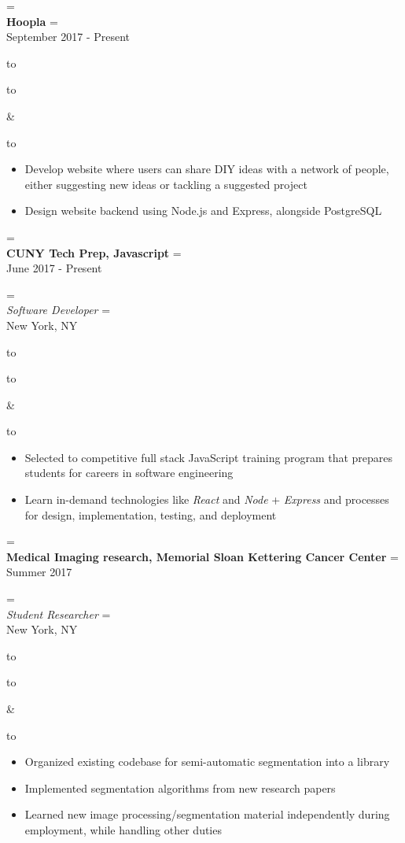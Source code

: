 \documentclass{article}
\newcommand{\appendtotoks}[2]{%
  #1=\expandafter{\the#1#2}%
}
\def\gobble#1{}
\def\gobblefirst#1{%
  #1\expandafter\expandafter\expandafter{\expandafter\gobble\the#1}}
\newcommand{\sectionTitle}[1]{{\Large #1} \vspace{4pt}}
\newenvironment{resumesection}[1]
  {\sectionTitle{#1}}
	{\vspace{10pt}}
\newcommand{\placeStyle}[1]{\textbf{#1}}
\newcommand{\positionStyle}[1]{\textit{#1}}
\newenvironment{newplace}
  {
    \newtoks\leftToks
    \newtoks\rightToks
    \newcommand{\placerow}[2]{%
      \appendtotoks{\leftToks}{\\\placeStyle{##1}}%
      \appendtotoks{\rightToks}{\\##2}}
    \newcommand{\jobrow}[2]{%
      \appendtotoks{\leftToks}{\\\positionStyle{##1}}%
      \appendtotoks{\rightToks}{\\##2}}
    \newcommand{\plainrow}[2]{%
      \appendtotoks{\leftToks}{\\##1}%
      \appendtotoks{\rightToks}{\\##2}}
    \setlength{\tabcolsep}{0pt}%
  }
  {%
    \begin{tabu} to \linewidth [h!]{X[65,l]X[35,r]}
      \begin{tabu} to \linewidth {X}
        \gobblefirst\leftToks
        \the\leftToks
      \end{tabu}
      &
      \begin{tabu} to \linewidth {X[r]}
        \gobblefirst\rightToks
        \the\rightToks
      \end{tabu}
    \end{tabu}%
  }
\newenvironment{bullets}
	{\begin{itemize}[noitemsep, topsep=0pt]}
	{\end{itemize}}
\begin{document}
\begin{resumesection}{Relevant Experience}


\begin{newplace}
  \placerow{Hoopla}{September 2017 - Present}
\end{newplace}

\begin{bullets}
  \item Develop website where users can share DIY ideas with a network
        of people, either suggesting new ideas or tackling a suggested
        project 
  \item Design website backend using Node.js and Express, alongside
        PostgreSQL 
\end{bullets}


\begin{newplace}
	\placerow{CUNY Tech Prep, Javascript}
				   {June 2017 - Present}
	\jobrow  {Software Developer}
					 {New York, NY}
\end{newplace}

\begin{bullets}
  \item Selected to competitive full stack JavaScript training program
        that prepares students for careers in software engineering
  \item Learn in-demand technologies like \textit{React} and
        \textit{Node} + \textit{Express} and processes for design,
        implementation, testing, and deployment
\end{bullets}


\begin{newplace}
  \placerow{Medical Imaging research, Memorial Sloan Kettering Cancer
            Center}
				   {Summer 2017}
  \jobrow  {Student Researcher}
				   {New York, NY}
\end{newplace}

\begin{bullets}
  \item Organized existing codebase for semi-automatic segmentation
        into a library
  \item Implemented segmentation algorithms from new research papers
  \item Learned new image processing/segmentation material
        independently during employment, while handling other duties
\end{bullets}


\end{resumesection}
\end{document}
